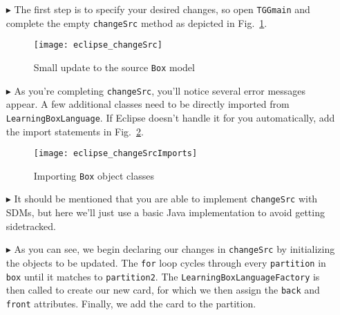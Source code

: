 \begin{itemize}

\item[$\blacktriangleright$] The first step is to specify your desired changes, so open \texttt{TGGmain} and complete the empty \texttt{changeSrc} method as
depicted in Fig.~\ref{eclipse:changeSrc}. 

\vspace{0.5cm}

\begin{figure}[htbp]
\begin{center}
  \texttt{[image: eclipse\_changeSrc]}
  \caption{Small update to the source \texttt{Box} model}
  \label{eclipse:changeSrc}
\end{center}
\end{figure}

\vspace{0.5cm}

\item[$\blacktriangleright$] As you're completing \texttt{changeSrc}, you'll notice several error messages appear. A few additional classes need to be directly
imported from \texttt{LearningBoxLanguage}. If Eclipse doesn't handle it for you automatically, add the import statements in
Fig.~\ref{eclipse:changeSrcImports}.

\newpage

\begin{figure}[htbp]
\begin{center}
  \texttt{[image: eclipse\_changeSrcImports]}
  \caption{Importing \texttt{Box} object classes}
  \label{eclipse:changeSrcImports}
\end{center}
\end{figure}

\item[$\blacktriangleright$] It should be mentioned that you are able to implement \texttt{changeSrc} with SDMs, but here we'll just use a basic Java
implementation to avoid getting sidetracked.

\item[$\blacktriangleright$] As you can see, we begin declaring our changes in \texttt{changeSrc} by initializing the objects to be updated. The \texttt{for}
loop cycles through every \texttt{partition} in \texttt{box} until it matches to \texttt{partition2}. The \texttt{Learn\-ing\-Box\-Lang\-uage\-Fact\-ory} is then
called to create our new card, for which we then assign the \texttt{back} and \texttt{front} attributes. Finally, we add the card to the partition.
 

\end{itemize}
